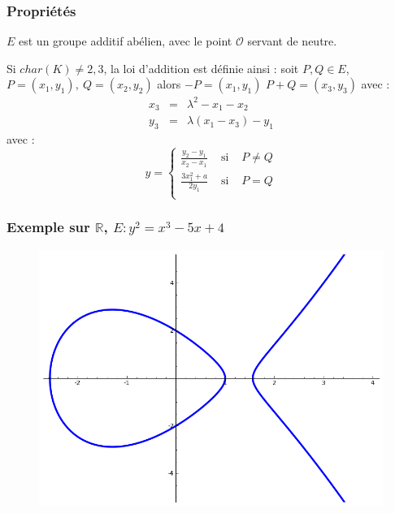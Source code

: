 \documentclass[9pt]{beamer}
\begin{document}
\begin{frame}
    \frametitle{Propriétés}
    \begin{thrm}
        $E$ est un groupe additif abélien, avec le point $\mathcal{O}$ servant de neutre.
    \end{thrm}

    \begin{df}
        Si $char(K) \neq 2,3$, la loi d'addition est définie ainsi : soit $P,Q \in E$, $P = (x_1,
        y_1),\ Q = (x_2, y_2)$ alors $-P = (x_1, y_1)$ $P + Q = (x_3, y_3)$ avec : \[
            \begin{array}{rcl}
                x_3 & = & \lambda^2 - x_1 - x_2 \\
                y_3 & = & \lambda(x_1 - x_3) - y_1
            \end{array}
        \]
        avec : \[
            y = \left \lbrace \begin{array}{rcl}
                \displaystyle \frac{y_2 - y_1}{x_2 - x_1} & \mbox{ si } & P \neq Q \\
                \displaystyle \frac{3x_1^2 + a}{2y_1} & \mbox{ si } & P = Q \\
                \end{array} \right.
            \]
    \end{df}
\end{frame}

\begin{frame}
    \frametitle{Exemple sur $\mathbb{R}$, $E : y^2 = x^3 - 5x + 4$}
    \begin{figure}
        \includegraphics[scale=0.5]{ecc41.png}
    \end{figure}
\end{frame}
\end{document}
